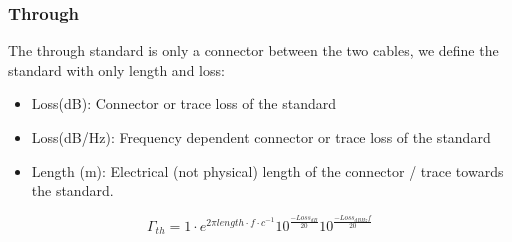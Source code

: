 \subsubsection{Through}
The through standard is only a connector between the two cables, we define the standard with only length and loss:
\begin{itemize}
	\item Loss(dB): Connector or trace loss of the standard
	\item Loss(dB/Hz): Frequency dependent connector or trace loss of the standard
	\item Length (m): Electrical (not physical) length of the connector / trace towards the standard.
\end{itemize}
\begin{equation}
\Gamma_{th} = 1 \cdot e^{2 \pi length\cdot f\cdot c^{-1}} 10^{\frac{-Loss_{dB}}{20}} 10^{\frac{-Loss_{dBHz} f }{20}}
\end{equation}

\newpage

